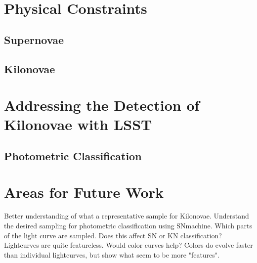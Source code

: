 \documentclass[11pt]{article}
\begin{document}
\section{Physical Constraints} %


\subsection{Supernovae}

\subsection{Kilonovae}

\section{Addressing the Detection of Kilonovae with LSST} %

\subsection{Photometric Classification}

\section{Areas for Future Work} %
Better understanding of what a representative sample for Kilonovae. 
Understand the desired sampling for photometric classification using SNmachine. Which parts of the light curve are sampled. Does this affect SN or KN classification?
Lightcurves are quite featureless. Would color curves help? Colors do evolve faster than individual lightcurves, but show what seem to be more "features". 




\end{document}
